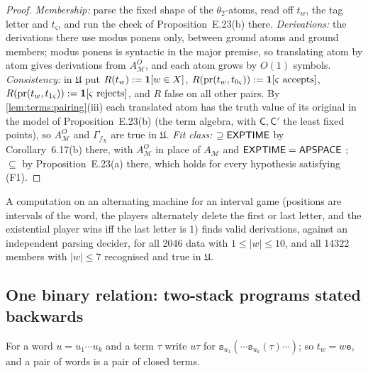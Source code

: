 \begin{proof}
\emph{Membership:} parse the fixed shape of the $\theta_2$-atoms, read off $t_w$, the tag letter and $t_\varsigma$, and run the check of Proposition~E.23(b) there. \emph{Derivations:} the derivations there use modus ponens only, between ground atoms and ground members; modus ponens is syntactic in the major premise, so translating atom by atom gives derivations from $A^O_{\mathcal M}$, and each atom grows by $O(1)$ symbols. \emph{Consistency:} in $\mathfrak U$ put $R(t_w):=\mathbf{1}[w\in X]$, $R(\mathrm{pr}(t_w,t_{0\varsigma})):=\mathbf{1}[\varsigma\text{ accepts}]$, $R(\mathrm{pr}(t_w,t_{1\varsigma})):=\mathbf{1}[\varsigma\text{ rejects}]$, and $R$ false on all other pairs. By \cref{lem:terms:pairing}(iii) each translated atom has the truth value of its original in the model of Proposition~E.23(b) (the term algebra, with $\mathsf C,\mathsf C'$ the least fixed points), so $A^O_{\mathcal M}$ and $\Gamma_{f_X}$ are true in $\mathfrak U$. \emph{Fit class:} $\supseteq\mathsf{EXPTIME}$ by Corollary~6.17(b) there, with $A^O_{\mathcal M}$ in place of $A_{\mathcal M}$ and $\mathsf{EXPTIME}=\mathsf{APSPACE}$ \citep{chandra1981alternation}; $\subseteq$ by Proposition~E.23(a) there, which holds for every hypothesis satisfying (F1).
\end{proof}

A computation on an alternating machine for an interval game (positions are intervals of the word, the players alternately delete the first or last letter, and the existential player wins iff the last letter is 1) finds valid derivations, against an independent parsing decider, for all 2046 data with $1\le\lvert w\rvert\le10$, and all 14322 members with $\lvert w\rvert\le7$ recognised and true in $\mathfrak U$.

\subsection{One binary relation: two-stack programs stated backwards}\label{app:terms:binary}

For a word $u=u_1\cdots u_k$ and a term $\tau$ write $u\tau$ for $\mathtt s_{u_1}(\cdots\mathtt s_{u_k}(\tau)\cdots)$; so $t_w=w\mathtt e$, and a pair of words is a pair of closed terms.

